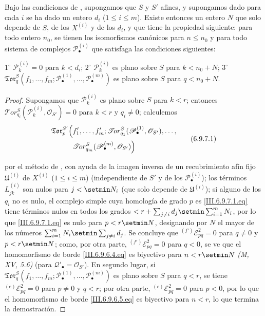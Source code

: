 \begin{corollary}[6.9.7]
\label{III.6.9.7}
Bajo las condiciones de , supongamos que $S$ y $S'$ afines, y supongamos dado para cada $i$ se ha dado un entero $d_i$
($1\leq i\leq m$). Existe entonces un entero $N$ que solo depende de $S$, de
los $X^{(i)}$ y de los $d_i$, y que tiene la propiedad siguiente: para todo
entero $n_0$, se tienen los isomorfismos canónicos  para
$n\leq n_0$ y para todo sistema de complejos
$\mathscr P_\bullet^{(i)}$ que satisfaga las condiciones siguientes:

  $1^\circ$ $\mathscr P_k^{(i)}=0$ para $k<d_i$;
  $2^\circ$ $\mathscr P_k^{(i)}$ es plano sobre $S$ para
  $k<n_0+N$;
  $3^\circ$
  $\mathfrak{Tor}_q^S(f_1,\ldots,f_m;
\mathscr P_\bullet^{(1)},\ldots,\mathscr P_\bullet^{(m)})$ es plano sobre
  $S$ para $q<n_0+N$.

\end{corollary}

\begin{proof}
Supongamos que $\mathscr P_k^{(i)}$ es plano sobre $S$ para $k<r$; entonces
$\mathscr{T}\!or_{q_i}^S(\mathscr P_k^{(i)},\mathscr O_{S'})=0$ para $k<r$
y $q_i\ne0$; calculemos
\[
\begin{split}
  \mathfrak{Tor}_p^{S'}\Bigl(
  &f'_1,\ldots,f'_m;
  \mathscr{T}\!or_{q_1}^S(\mathscr P_\bullet^{(1)},\mathscr O_{S'}),
  \ldots,\\
  &\mathscr{T}\!or_{q_m}^S(\mathscr P_\bullet^{(m)},\mathscr O_{S'})
  \Bigr)
\end{split}
\tag{6.9.7.1}\label{III.6.9.7.1.fr}
\]

por el método de , con ayuda de la imagen inversa de un
recubrimiento afín fijo $\mathfrak U^{(i)}$ de $X^{(i)}$
($1\leq i\leq m$) (independiente de $S'$ y de los
$\mathscr P_\bullet^{(i)}$); los términos $L_{jk}^{(i)}$ son nulos para
$j<\setmin N_i$ (que solo depende de $\mathfrak U^{(i)}$); si alguno de los $q_i$
no es nulo, el complejo simple cuya homología de grado $p$ es
\eqref{III.6.9.7.1.eq} tiene términos nulos en todos los grados
$<r+\sum_{j\ne i}d_j\setmin\sum_{i=1}^m N_i$,
por lo que \eqref{III.6.9.7.1.eq} es nulo para $p<r\setmin N$, designando por $N$
el mayor de los números
$\sum_{i=1}^m N_i\setmin\sum_{j\ne i}d_j$.
Se concluye que ${}^{(f')}\mathscr E_{pq}^2=0$ para $q\ne0$ y $p<r\setmin N$;
como, por otra parte, ${}^{(f')}\mathscr E_{pq}^2=0$ para $q<0$, se ve que el
homomorfismo de borde \eqref{III.6.9.6.4.eq} es biyectivo para $n<r\setmin N$
\emph{(M, XV, 5.6)} (para $\mathscr Q'_\bullet=\mathscr O_{S'}$). En segundo
lugar, si
$\mathfrak{Tor}_q^S
(f_1,\ldots,f_m;
\mathscr P_\bullet^{(1)},\ldots,\mathscr P_\bullet^{(m)})$
es plano sobre $S$ para $q<r$, se tiene
${}^{(e)}\mathscr E_{pq}^2=0$ para $p\ne0$ y $q<r$; por otra parte,
${}^{(e)}\mathscr E_{pq}^2=0$ para $p<0$, por lo que el homomorfismo de borde
\eqref{III.6.9.6.5.eq} es biyectivo para $n<r$, lo que termina la
demostración.
\end{proof}

